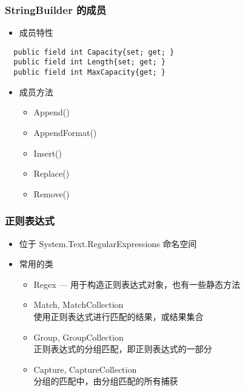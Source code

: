 \begin{frame}[fragile]
\frametitle{StringBuilder 的成员}
\begin{itemize}
\item 成员特性
\end{itemize}
\begin{lstlisting}
  public field int Capacity{set; get; } 
  public field int Length{set; get; } 
  public field int MaxCapacity{get; } 
\end{lstlisting}
\begin{itemize}
\item 成员方法
\begin{itemize}
\item Append()
\item AppendFormat()
\item Insert()
\item Replace()
\item Remove()
\end{itemize}
\end{itemize}
\end{frame}





\begin{frame}
\frametitle{正则表达式}
\begin{itemize}
\setlength{\itemsep}{8pt plus 1pt}
\item 位于 System.Text.RegularExpressions 命名空间
\item 常用的类
\begin{itemize}
\setlength{\itemsep}{6pt plus 1pt}
\item Regex  --- 用于构造正则表达式对象，也有一些静态方法
\item Match, MatchCollection \\
  使用正则表达式进行匹配的结果，或结果集合
\item Group, GroupCollection \\
  正则表达式的分组匹配，即正则表达式的一部分
\item Capture, CaptureCollection \\
  分组的匹配中，由分组匹配的所有捕获
\end{itemize}
\end{itemize}
\end{frame}

